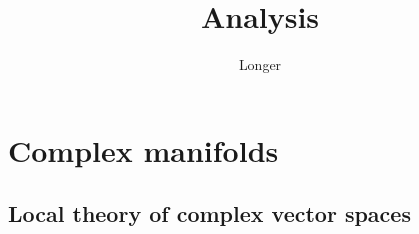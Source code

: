 \documentclass[11pt]{book}
\title{Analysis}
\author{Longer}
\theoremstyle{definition}
\begin{document}
\maketitle
\tableofcontents
\setlength{\abovedisplayskip}{5pt}
\setlength{\belowdisplayskip}{5pt}
\iffalse



















\fi


\chapter{Complex manifolds}
\section{Local theory of complex vector spaces}
\end{document}
